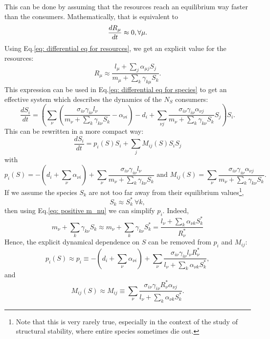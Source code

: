 \documentclass[12pt]{report}
\begin{document}
This can be done by assuming that the resources reach an equilibrium way faster than the consumers.
Mathematically, that is equivalent to
\begin{equation}
  \frac{dR_\mu}{dt} \approx 0, \\ \forall \mu.
\end{equation}
Using Eq.\eqref{eq: differential eq for resources}, we get an explicit value for the resources:
\begin{equation}
  R_\mu \approx \frac{l_\mu+\sum_j \alpha_{\mu j}S_j}{m_\mu + \sum_k \gamma_{k\mu}S_k}.
\end{equation}
This expression can be used in Eq.\eqref{eq: differential eq for species} to get an effective system which describes the dynamics of the $N_S$ consumers:
\begin{equation}
  \frac{dS_i}{dt} = \left(\sum_\nu \left(\frac{\sigma_{i\nu}\gamma_{i\nu}l_\nu}{m_\nu+\sum_k \gamma_{k\nu}S_k} - \alpha_{\nu i}\right) -d_i + \sum_{\nu j} \frac{\sigma_{i\nu}\gamma_{i\nu}\alpha_{\nu j}}{m_\nu+\sum_{k}\gamma_{k\nu}S_k}S_j \right) S_i.
\end{equation}
This can be rewritten in a more compact way:
\begin{equation}
  \frac{dS_i}{dt} = p_i(S) S_i + \sum_j M_{ij}(S)S_i S_j \label{eq: effective equations of evolution}
\end{equation}
with
\begin{equation}
    p_i(S) = -\left(d_i+\sum_{\nu}\alpha_{\nu i}\right) + \sum_\nu \frac{\sigma_{i\nu}\gamma_{i\nu}l_\nu}{m_\nu+\sum_k \gamma_{k\nu}S_k}\text{ and } M_{ij}(S)=\sum_{\nu}\frac{\sigma_{i\nu}\gamma_{i\nu}\alpha_{\nu j}}{m_\nu+\sum_{k}\gamma_{k\nu}S_k}.
\end{equation}
If we assume the species $S_k$ are not too far away from their equilibrium values\footnote{Note that this is very rarely true, especially in the context of the study of structural stability, where entire species sometimes die out.}, \ie
\begin{equation}
S_k \approx S^*_k \ \forall k,
\end{equation}
then using Eq.\eqref{eq: positive m_nu} we can simplify $p_i$. Indeed,
\begin{equation}
m_\nu + \sum_k \gamma_{k\nu} S_k \approx m_\nu + \sum_k \gamma_{k\nu}S^*_k = \frac{l_\nu + \sum_k \alpha_{\nu k}S^*_k}{R^*_\nu} \label{eq: equality fluxes resource}
\end{equation}
Hence, the explicit dynamical dependence on $S$ can be removed from $p_i$ and $M_{ij}$:
\begin{equation}
p_i(S) \approx p_i \equiv - \left(d_i + \sum_\nu \alpha_{\nu i}\right) + \sum_\nu \frac{\sigma_{i\nu}\gamma_{i\nu}l_\nu R^*_\nu}{l_\nu + \sum_k \alpha_{\nu k}S^*_k},
\end{equation} and
\begin{equation}
M_{ij}(S) \approx M_{ij} \equiv \sum_\nu \frac{\sigma_{i\nu} \gamma_{i\nu} R^*_\nu \alpha_{\nu j}}{l_\nu + \sum_k{\alpha_{\nu k} S^*_k}}.
\end{equation}
\end{document}
